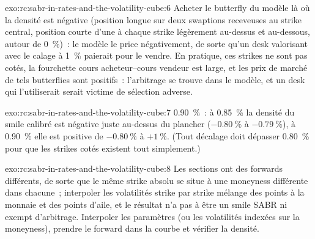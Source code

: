 \begin{solution}{exo:rc:sabr-in-rates-and-the-volatility-cube:6}
Acheter le butterfly du modèle là où la densité est négative (position longue sur deux
swaptions receveuses au strike central, position courte d'une à chaque strike légèrement
au-dessus et au-dessous, autour de 0~\%)~: le modèle le price négativement, de sorte qu'un desk
valorisant avec le calage à 1~\% paierait pour le vendre. En pratique, ces strikes ne sont pas cotés, la fourchette cours acheteur--cours vendeur est large,
et les prix de marché de tels butterflies sont positifs~: l'arbitrage
se trouve dans le modèle, et un desk qui l'utiliserait serait victime de sélection adverse.
\end{solution}

\begin{solution}{exo:rc:sabr-in-rates-and-the-volatility-cube:7}
0.90~\%~: à 0.85~\% la densité du smile calibré est négative juste au-dessus du
plancher ($-0.80~\%$ à $-0.79~\%$), à 0.90~\% elle est positive de $-0.80~\%$ à $+1~\%$.
(Tout décalage doit dépasser 0.80~\% pour que les strikes cotés existent tout simplement.)
\end{solution}

\begin{solution}{exo:rc:sabr-in-rates-and-the-volatility-cube:8}
Les sections ont des forwards différents, de sorte que le même strike absolu se situe à
une moneyness différente dans chacune~; interpoler les volatilités strike par strike mélange
des points à la monnaie et des points d'aile, et le résultat n'a pas à être un smile SABR ni
exempt d'arbitrage. Interpoler les paramètres (ou les volatilités indexées sur la moneyness),
prendre le forward dans la courbe et vérifier la densité.
\end{solution}

